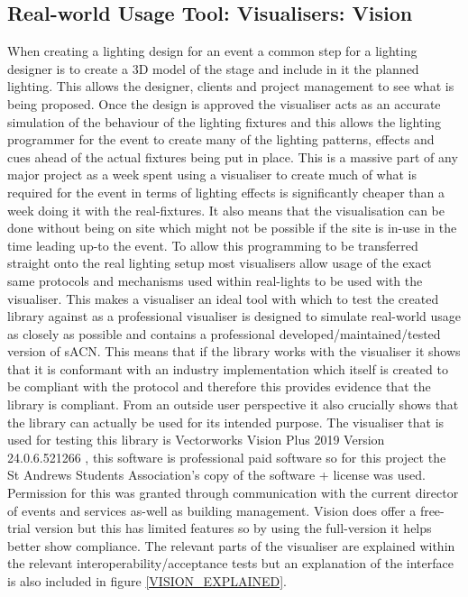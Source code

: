 \documentclass[11pt,a4paper]{article}
\begin{document}
\subsection{Real-world Usage Tool: Visualisers: Vision}
When creating a lighting design for an event a common step for a lighting designer is to create a 3D model of the stage and include in it the planned lighting. This allows the designer, clients and project management to see what is being proposed. Once the design is approved the visualiser acts as an accurate simulation of the behaviour of the lighting fixtures and this allows the lighting programmer for the event to create many of the lighting patterns, effects and cues ahead of the actual fixtures being put in place. This is a massive part of any major project as a week spent using a visualiser to create much of what is required for the event in terms of lighting effects is significantly cheaper than a week doing it with the real-fixtures. It also means that the visualisation can be done without being on site which might not be possible if the site is in-use in the time leading up-to the event. To allow this programming to be transferred straight onto the real lighting setup most visualisers allow usage of the exact same protocols and mechanisms used within real-lights to be used with the visualiser. This makes a visualiser an ideal tool with which to test the created library against as a professional visualiser is designed to simulate real-world usage as closely as possible and contains a professional developed/maintained/tested version of sACN. This means that if the library works with the visualiser it shows that it is conformant with an industry implementation which itself is created to be compliant with the protocol and therefore this provides evidence that the library is compliant. From an outside user perspective it also crucially shows that the library can actually be used for its intended purpose. The visualiser that is used for testing this library is Vectorworks Vision Plus 2019 Version 24.0.6.521266 \cite{VISION}, this software is professional paid software so for this project the St Andrews Students Association's copy of the software + license was used. Permission for this was granted through communication with the current director of events and services as-well as building management. Vision does offer a free-trial version but this has limited features so by using the full-version it helps better show compliance. The relevant parts of the visualiser are explained within the relevant interoperability/acceptance tests but an explanation of the interface is also included in figure \ref{VISION_EXPLAINED}.\\
\end{document}
